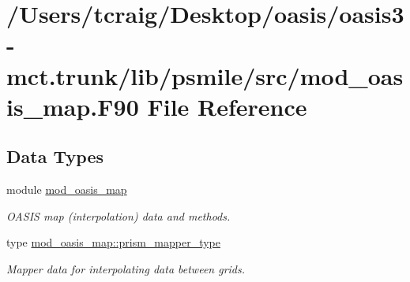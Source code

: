 \hypertarget{mod__oasis__map_8_f90}{\section{/\+Users/tcraig/\+Desktop/oasis/oasis3-\/mct.trunk/lib/psmile/src/mod\+\_\+oasis\+\_\+map.F90 File Reference}
\label{mod__oasis__map_8_f90}
}
\subsection*{Data Types}
\begin{DoxyCompactItemize}
\item 
module \hyperlink{classmod__oasis__map}{mod\+\_\+oasis\+\_\+map}
\begin{DoxyCompactList}\small\item\em O\+A\+S\+I\+S map (interpolation) data and methods. \end{DoxyCompactList}\item 
type \hyperlink{structmod__oasis__map_1_1prism__mapper__type}{mod\+\_\+oasis\+\_\+map\+::prism\+\_\+mapper\+\_\+type}
\begin{DoxyCompactList}\small\item\em Mapper data for interpolating data between grids. \end{DoxyCompactList}\end{DoxyCompactItemize}
